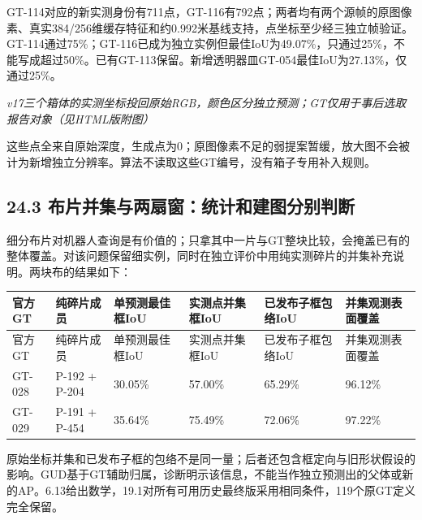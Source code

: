 \documentclass[UTF8,fontset=fandol]{ctexart}
\begin{document}
GT-114对应的新实测身份有711点，GT-116有792点；两者均有两个源帧的原图像素、真实384/256维缓存特征和约0.992米基线支持，点坐标至少经三独立帧验证。GT-114通过75\%；GT-116已成为独立实例但最佳IoU为49.07\%，只通过25\%，不能写成超过50\%。已有GT-113保留。新增透明器皿GT-054最佳IoU为27.13\%，仅通过25\%。



\textit{v17三个箱体的实测坐标投回原始RGB，颜色区分独立预测；GT仅用于事后选取报告对象（见HTML版附图）}



这些点全来自原始深度，生成点为0；原图像素不足的弱提案暂缓，放大图不会被计为新增独立分辨率。算法不读取这些GT编号，没有箱子专用补入规则。



\subsection*{24.3 布片并集与两扇窗：统计和建图分别判断}

细分布片对机器人查询是有价值的；只拿其中一片与GT整块比较，会掩盖已有的整体覆盖。对该问题保留细实例，同时在独立评价中用纯实测碎片的并集补充说明。两块布的结果如下：



{\small
\begin{longtable}{|p{}|p{}|p{}|p{}|p{}|p{}|}
\hline
官方GT & 纯碎片成员 & 单预测最佳框IoU & 实测点并集框IoU & 已发布子框包络IoU & 并集观测表面覆盖 \\ \hline
\endfirsthead
\hline
官方GT & 纯碎片成员 & 单预测最佳框IoU & 实测点并集框IoU & 已发布子框包络IoU & 并集观测表面覆盖 \\ \hline
\endhead
GT-028 & P-192 + P-204 & 30.05\% & 57.00\% & 65.29\% & 96.12\% \\ \hline
GT-029 & P-191 + P-454 & 35.64\% & 75.49\% & 72.06\% & 97.22\% \\ \hline
\end{longtable}
}

原始坐标并集和已发布子框的包络不是同一量；后者还包含框定向与旧形状假设的影响。GUD基于GT辅助归属，诊断明示该信息，不能当作独立预测出的父体或新的AP。6.13给出数学，19.1对所有可用历史最终版采用相同条件，119个原GT定义完全保留。
\end{document}
